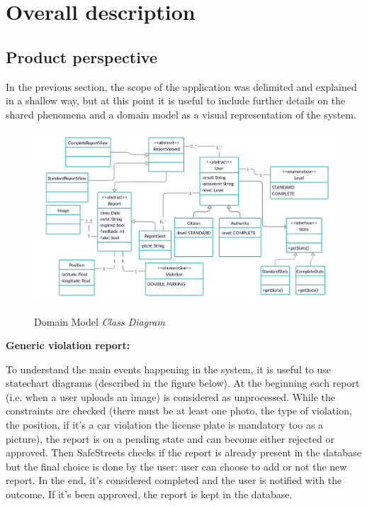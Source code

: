 \documentclass[../RASD.tex]{subfiles}
\begin{document}
    \chapter{Overall description}\label{ch:overall-description}
    \section{Product perspective}\label{sec:product-perspective}
    In the previous section, the scope of the application was delimited and explained in a shallow way, but at this point it is useful to include further details on the shared phenomena and a domain model as a visual representation of the system.

    \begin{figure}[H]
        \centering
        \includegraphics[scale = 1.1]{assets/domainModel.png}\\[1.6 cm]
        \caption[Domain Model \textit{Class Diagram}]{Domain Model \textit{Class Diagram}}
    \end{figure}
    \textbf{Generic violation report:}

    To understand the main events happening in the system, it is useful to use statechart diagrams (described in the figure below).
    At the beginning each report (i.e. when a user uploads an image) is considered as unprocessed.
    While the constraints are checked (there must be at least one photo, the type of violation, the position,
    if it’s a car violation the license plate is mandatory too as a picture), the report is on a pending state and can become either rejected or approved.
    Then SafeStreets checks if the report is already present in the database but the final choice is done by the user: user can choose to add or not the new report.
    In the end, it’s considered completed and the user is notified with the outcome.
    If it’s been approved, the report is kept in the database.
\end{document}
